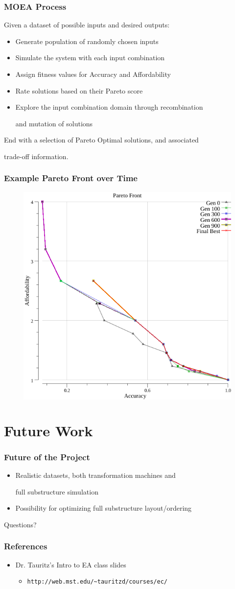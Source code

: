\documentclass{beamer}
\begin{document}
\begin{frame}
\frametitle{MOEA Process}
Given a dataset of possible inputs and desired outputs:
\begin{itemize}
\item Generate population of randomly chosen inputs\pause
\item Simulate the system with each input combination\pause
\item Assign fitness values for Accuracy and Affordability\pause
\item Rate solutions based on their Pareto score\pause
\item Explore the input combination domain through recombination

and mutation of solutions
\end{itemize}
End with a selection of Pareto Optimal solutions, and associated

trade-off information.
\end{frame}

\begin{frame}
\frametitle{Example Pareto Front over Time}
\begin{figure}
\includegraphics[width=0.6\linewidth]{points.png}
\end{figure}
\end{frame}

\section{Future Work}
\begin{frame}
\frametitle{Future of the Project}
\begin{itemize}
\item Realistic datasets, both transformation machines and

full substructure simulation\pause
\item Possibility for optimizing full substructure layout/ordering
\end{itemize}
\end{frame}

\begin{frame}
\Huge{\centerline{Questions?}}
\end{frame}

\begin{frame}[fragile]
\frametitle{References}
\begin{itemize}
\item Dr. Tauritz's Intro to EA class slides 
	\begin{itemize}	
	\item \verb|http://web.mst.edu/~tauritzd/courses/ec/|
	\end{itemize}
\end{itemize}
\end{frame}
\end{document}
